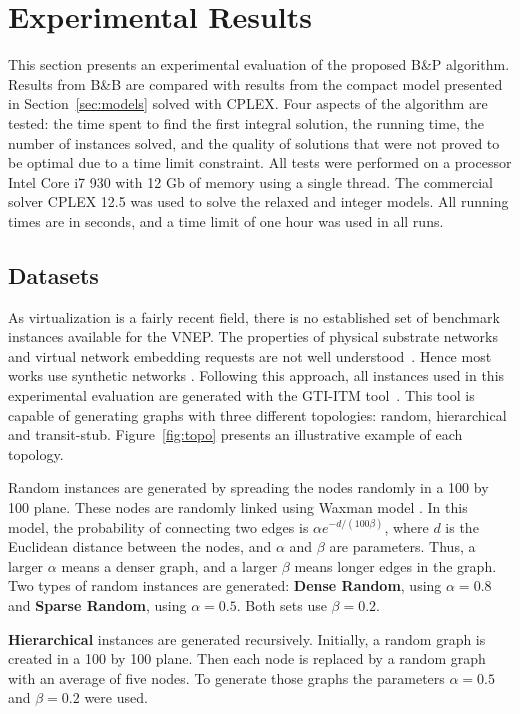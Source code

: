 \chapter{Experimental Results}
\label{ch:results}


This section presents an experimental evaluation of the proposed B\&P algorithm. 
Results from B\&B are compared with results from the compact model presented in Section~\ref{sec:models} solved with CPLEX\@. 
Four aspects of the algorithm are tested: the time spent to find the first integral solution, the running time, the number of instances solved, and the quality of solutions that were not proved to be optimal due to a time limit constraint. 
All tests were performed on a processor Intel Core i7 930 with 12 Gb of memory using a single thread. The commercial solver CPLEX 12.5 was used to solve the relaxed and integer models. All running times are in seconds, and a time limit of one hour was used in all runs.


\section{Datasets}
\label{sec:datasets}

As virtualization is a fairly recent field, there is no established set of benchmark instances available for the VNEP\@.
The properties of physical substrate networks and virtual network embedding requests are not well understood~\cite{Chowdhury:2012}. Hence most works use synthetic networks \cite{FischerSurvey}.
Following this approach, all instances used in this experimental evaluation are generated with the GTI-ITM tool~\cite{Zagura:1996}.
This tool is capable of generating graphs with three different topologies: random, hierarchical and transit-stub. Figure~\ref{fig:topo} presents an illustrative example of each topology.

Random instances are generated by spreading the nodes randomly in a 100 by 100 plane. These nodes are randomly linked using Waxman model \cite{Zagura:1996}. In this model, the probability of connecting two edges is $\alpha e^{- d / (100 \beta)}$, where $d$ is the Euclidean distance between the nodes, and $\alpha$ and $\beta$ are parameters. Thus, a larger $\alpha$ means a denser graph, and a larger $\beta$ means longer edges in the graph. Two types of random instances are generated: \textbf{Dense Random}, using $\alpha = 0.8$ and \textbf{Sparse Random}, using $\alpha = 0.5$. 
Both sets use $\beta = 0.2$.


\textbf{Hierarchical} instances are generated recursively. Initially, a random graph is created in a 100 by 100 plane. Then each node is replaced by a random graph with an average of five nodes. To generate those graphs the parameters $\alpha = 0.5$ and $\beta = 0.2$ were used.

